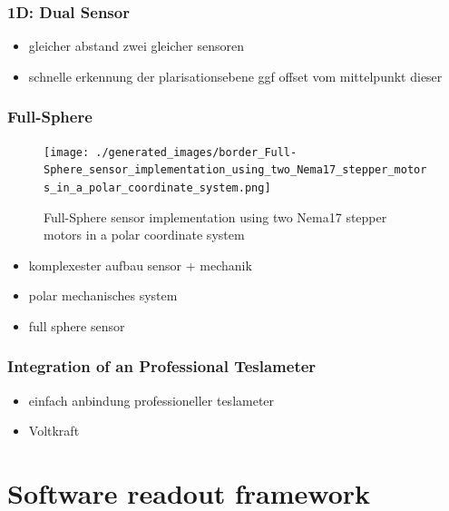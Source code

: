 \hypertarget{d-dual-sensor}{%
\subsection{1D: Dual Sensor}\label{d-dual-sensor}}

\begin{itemize}
\tightlist
\item
  gleicher abstand zwei gleicher sensoren
\item
  schnelle erkennung der plarisationsebene ggf offset vom mittelpunkt
  dieser
\end{itemize}

\hypertarget{full-sphere}{%
\subsection{Full-Sphere}\label{full-sphere}}

\begin{figure}
\centering
\texttt{[image: ./generated\_images/border\_Full-Sphere\_sensor\_implementation\_using\_two\_Nema17\_stepper\_motors\_in\_a\_polar\_coordinate\_system.png]}
\caption{Full-Sphere sensor implementation using two Nema17 stepper
motors in a polar coordinate system
\label{Full-Sphere_sensor_implementation_using_two_Nema17_stepper_motors_in_a_polar_coordinate_system.png}}
\end{figure}

\begin{itemize}
\tightlist
\item
  komplexester aufbau sensor + mechanik
\item
  polar mechanisches system
\item
  full sphere sensor
\end{itemize}

\hypertarget{integration-of-an-professional-teslameter}{%
\subsection{Integration of an Professional
Teslameter}\label{integration-of-an-professional-teslameter}}

\begin{itemize}
\tightlist
\item
  einfach anbindung professioneller teslameter
\item
  Voltkraft
\end{itemize}

\hypertarget{software-readout-framework}{%
\chapter{Software readout framework}\label{software-readout-framework}}

